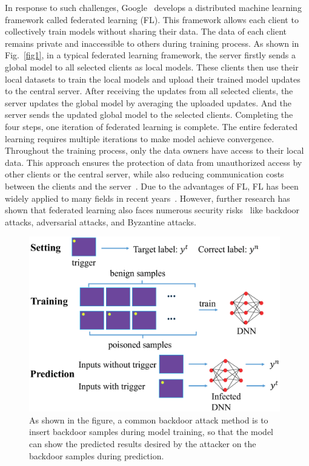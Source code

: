 \documentclass[pdflatex,sn-mathphys-num]{sn-jnl}%
\theoremstyle{thmstyleone}%
\theoremstyle{thmstyletwo}%
\theoremstyle{thmstylethree}%
\begin{document}
In response to such challenges, Google~\cite{mcmahan2017communication} develops a
distributed machine learning framework called federated
learning (FL). This framework allows each client to collectively train models without sharing their data. The data
of each client remains private and inaccessible to others
during training process. As shown in Fig.~\ref{fig1}, in a typical federated learning framework, the server firstly sends a global
model to all selected clients as local models. These clients
then use their local datasets to train the local models and
upload their trained model updates to the central server.
After receiving the updates from all selected clients, the
server updates the global model by averaging the uploaded
updates. And the server sends the updated global model
to the selected clients. Completing the four steps, one iteration
of federated learning is complete. The entire federated
learning requires multiple iterations to make model achieve
convergence. Throughout the training process, only the
data owners have access to their local data. This approach
ensures the protection of data from unauthorized access
by other clients or the central server, while also reducing
communication costs between the clients and the server~\cite{yang2019federated}. Due to the advantages of FL, FL has been widely
applied to many fields in recent years~\cite{doshi2022federated,becking2022adaptive,liu2024vertical,liu2024recent,ye2024openfedllm,gecer2024federated}.
However,
further research has shown that federated learning also
faces numerous security risks~\cite{yazdinejad2024robust,zhang2024a3fl,rodriguez2023survey,tariq2023trustworthy,zhang2023survey} like backdoor
attacks, adversarial attacks, and Byzantine attacks.  
\begin{figure}[t]
	\centering
	\includegraphics[width=1.0\linewidth,height=3in]{output/fig2.eps}
	\caption{As shown in the figure, a common backdoor attack method
		is to insert backdoor samples during model training, so that the
		model can show the predicted results desired by the attacker on the
		backdoor samples during prediction.}
	\label{fig2}
\end{figure}
\end{document}
